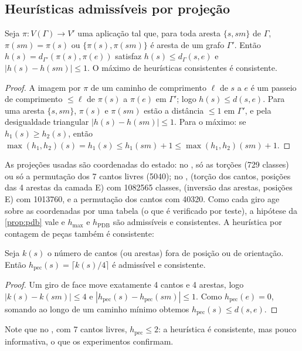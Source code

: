 \subsection{Heurísticas admissíveis por projeção}
\begin{proposition}\label{prop:pdb}\lit
Seja $\pi:V(\Gamma)\to V'$ uma aplicação tal que, para toda aresta $\{s,s m\}$ de $\Gamma$, $\pi(sm)=\pi(s)$ ou $\{\pi(s),\pi(sm)\}$ é aresta de um grafo $\Gamma'$. Então $h(s)=d_{\Gamma'}(\pi(s),\pi(e))$ satisfaz $h(s)\le d_\Gamma(s,e)$ e $|h(s)-h(sm)|\le1$. O máximo de heurísticas consistentes é consistente.
\end{proposition}
\begin{proof}
A imagem por $\pi$ de um caminho de comprimento $\ell$ de $s$ a $e$ é um passeio de comprimento $\le\ell$ de $\pi(s)$ a $\pi(e)$ em $\Gamma'$; logo $h(s)\le d(s,e)$. Para uma aresta $\{s,sm\}$, $\pi(s)$ e $\pi(sm)$ estão a distância $\le1$ em $\Gamma'$, e pela desigualdade triangular $|h(s)-h(sm)|\le1$. Para o máximo: se $h_1(s)\ge h_2(s)$, então $\max(h_1,h_2)(s)=h_1(s)\le h_1(sm)+1\le\max(h_1,h_2)(sm)+1$.
\end{proof}
\noindent As projeções usadas são coordenadas do estado: no , só as torções (729 classes) ou só a permutação dos 7 cantos livres (5040); no , (torção dos cantos, posições das 4 arestas da camada E) com \num{1082565} classes, (inversão das arestas, posições E) com \num{1013760}, e a permutação dos cantos com \num{40320}. Como cada giro age sobre as coordenadas por uma tabela (o que é verificado por teste), a hipótese da \cref{prop:pdb} vale e $h_{\max}$ e $h_{\mathrm{PDB}}$ são admissíveis e consistentes. A heurística por contagem de peças também é consistente:
\begin{proposition}\label{prop:pec}\proj
Seja $k(s)$ o número de cantos (ou arestas) fora de posição ou de orientação. Então $h_{\mathrm{pec}}(s)=\lceil k(s)/4\rceil$ é admissível e consistente.
\end{proposition}
\begin{proof}
Um giro de face move exatamente 4 cantos e 4 arestas, logo $|k(s)-k(sm)|\le4$ e $|h_{\mathrm{pec}}(s)-h_{\mathrm{pec}}(sm)|\le1$. Como $h_{\mathrm{pec}}(e)=0$, somando ao longo de um caminho mínimo obtemos $h_{\mathrm{pec}}(s)\le d(s,e)$.
\end{proof}
\noindent Note que no , com 7 cantos livres, $h_{\mathrm{pec}}\le2$: a heurística é consistente, mas pouco informativa, o que os experimentos confirmam.

